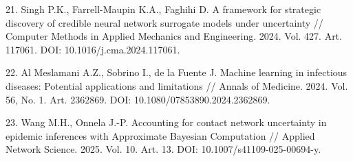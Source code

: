 \documentclass[12pt,a4paper,twocolumn]{article}
\begin{document}
\begin{small}
21. Singh P.K., Farrell-Maupin K.A., Faghihi D. A framework for strategic discovery of credible neural network surrogate models under uncertainty // Computer Methods in Applied Mechanics and Engineering. 2024. Vol. 427. Art. 117061. DOI: 10.1016/j.cma.2024.117061.

22. Al Meslamani A.Z., Sobrino I., de la Fuente J. Machine learning in infectious diseases: Potential applications and limitations // Annals of Medicine. 2024. Vol. 56, No. 1. Art. 2362869. DOI: 10.1080/07853890.2024.2362869.

23. Wang M.H., Onnela J.-P. Accounting for contact network uncertainty in epidemic inferences with Approximate Bayesian Computation // Applied Network Science. 2025. Vol. 10. Art. 13. DOI: 10.1007/s41109-025-00694-y.

\end{small}
\end{document}
